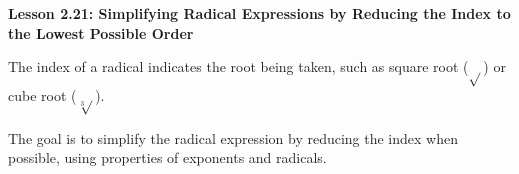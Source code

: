 \begin{center}
\textbf{Lesson 2.21: Simplifying Radical Expressions by Reducing the Index to the Lowest Possible Order}
\end{center}

\vspace*{1ex}

 The index of a radical indicates the root being taken, such as square root (\( \sqrt{} \)) or cube root (\( \sqrt[{\scriptstyle 3}]{} \)).

 The goal is to simplify the radical expression by reducing the index when possible, using properties of exponents and radicals.



